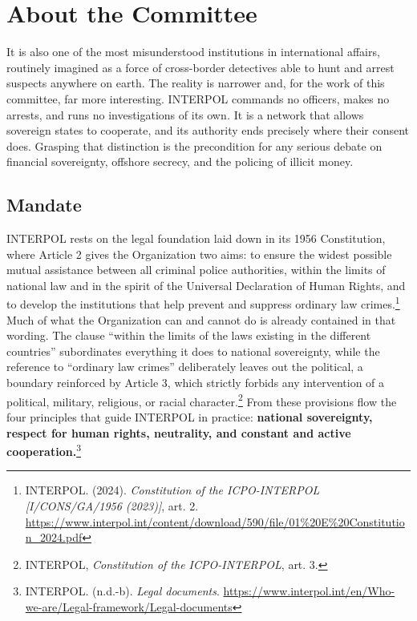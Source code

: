 \section{About the Committee}


It is also one of the most misunderstood institutions in international affairs, routinely imagined as a force of cross-border detectives able to hunt and arrest suspects anywhere on earth. The reality is narrower and, for the work of this committee, far more interesting. INTERPOL commands no officers, makes no arrests, and runs no investigations of its own\emph{.} It is a network that allows sovereign states to cooperate, and its authority ends precisely where their consent does. Grasping that distinction is the precondition for any serious debate on financial sovereignty, offshore secrecy, and the policing of illicit money.

\subsection{Mandate}

INTERPOL rests on the legal foundation laid down in its 1956 Constitution, where Article 2 gives the Organization two aims: to ensure the widest possible mutual assistance between all criminal police authorities, within the limits of national law and in the spirit of the Universal Declaration of Human Rights, and to develop the institutions that help prevent and suppress ordinary law crimes.\footnote{INTERPOL. (2024). \emph{Constitution of the ICPO-INTERPOL [I/CONS/GA/1956 (2023)]}, art. 2. \url{https://www.interpol.int/content/download/590/file/01\%20E\%20Constitution_2024.pdf}} Much of what the Organization can and cannot do is already contained in that wording. The clause “within the limits of the laws existing in the different countries” subordinates everything it does to national sovereignty, while the reference to “ordinary law crimes” deliberately leaves out the political, a boundary reinforced by Article 3, which strictly forbids any intervention of a political, military, religious, or racial character.\footnote{INTERPOL, \emph{Constitution of the ICPO-INTERPOL}, art. 3.} From these provisions flow the four principles that guide INTERPOL in practice: \textbf{national sovereignty, respect for human rights, neutrality, and constant and active cooperation.}\footnote{INTERPOL. (n.d.-b). \emph{Legal documents}. \url{https://www.interpol.int/en/Who-we-are/Legal-framework/Legal-documents}}

